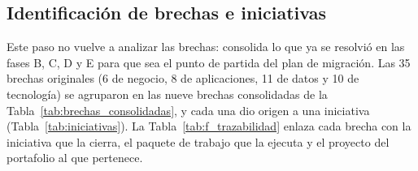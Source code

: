 \subsection{Identificación de brechas e iniciativas}

Este paso no vuelve a analizar las brechas: consolida lo que ya se resolvió en las fases B, C, D y E para que sea el punto de partida del plan de migración. Las 35 brechas originales (6 de negocio, 8 de aplicaciones, 11 de datos y 10 de tecnología) se agruparon en las nueve brechas consolidadas de la Tabla~\ref{tab:brechas_consolidadas}, y cada una dio origen a una iniciativa (Tabla~\ref{tab:iniciativas}). La Tabla~\ref{tab:f_trazabilidad} enlaza cada brecha con la iniciativa que la cierra, el paquete de trabajo que la ejecuta y el proyecto del portafolio al que pertenece.

